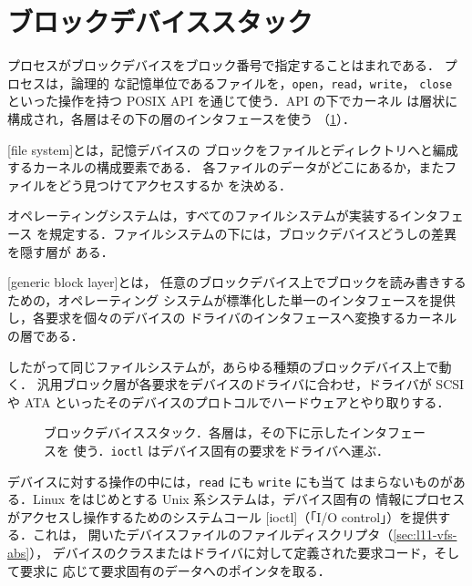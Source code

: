 \documentclass[../main.tex]{subfiles}
\begin{document}
\section{ブロックデバイススタック}
\label{sec:l11-block-stack}

プロセスがブロックデバイスをブロック番号で指定することはまれである．
プロセスは，論理的
な記憶単位であるファイルを，\texttt{open}，\texttt{read}，\texttt{write}，
\texttt{close} といった操作を持つ POSIX API を通じて使う．API の下でカーネル
は層状に構成され，各層はその下の層のインタフェースを使う
（\cref{fig:l11-block-stack}）．

\begin{definition}[ファイルシステム]
  [file system]とは，記憶デバイスの
  ブロックをファイルとディレクトリへと編成するカーネルの構成要素である．
  各ファイルのデータがどこにあるか，またファイルをどう見つけてアクセスするか
  を決める．
\end{definition}

オペレーティングシステムは，すべてのファイルシステムが実装するインタフェース
を規定する．ファイルシステムの下には，ブロックデバイスどうしの差異を隠す層が
ある．

\begin{definition}[汎用ブロック層]
  [generic block layer]とは，
  任意のブロックデバイス上でブロックを読み書きするための，オペレーティング
  システムが標準化した単一のインタフェースを提供し，各要求を個々のデバイスの
  ドライバのインタフェースへ変換するカーネルの層である．
\end{definition}

したがって同じファイルシステムが，あらゆる種類のブロックデバイス上で動く．
汎用ブロック層が各要求をデバイスのドライバに合わせ，ドライバが SCSI や ATA
といったそのデバイスのプロトコルでハードウェアとやり取りする．

\begin{figure}[htbp]
  \centering
  
  \caption{ブロックデバイススタック．各層は，その下に示したインタフェースを
    使う．\texttt{ioctl} はデバイス固有の要求をドライバへ運ぶ．}
  \label{fig:l11-block-stack}
\end{figure}

デバイスに対する操作の中には，\texttt{read} にも \texttt{write} にも当て
はまらないものがある．Linux をはじめとする Unix 系システムは，デバイス固有の
情報にプロセスがアクセスし操作するためのシステムコール
[ioctl]（「I/O control」）を提供する．これは，
開いたデバイスファイルのファイルディスクリプタ（\cref{sec:l11-vfs-abs}），
デバイスのクラスまたはドライバに対して定義された要求コード，そして要求に
応じて要求固有のデータへのポインタを取る．
\end{document}
